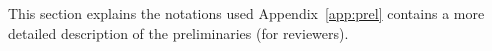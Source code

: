 \documentclass[runningheads]{llncs}
\newcommand{\support}{\mathit{Supp}}
\newcommand{\T}{\Sigma} %
\begin{document}
This section explains the notations used
Appendix~\ref{app:prel} contains a more detailed description of
the preliminaries (for reviewers).








\end{document}
